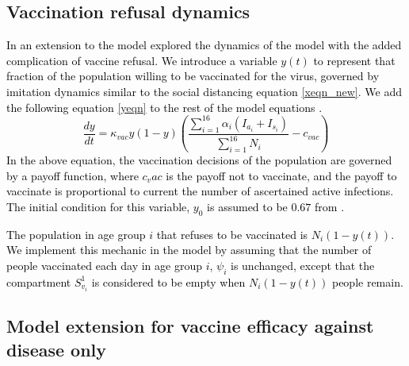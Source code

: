 \subsection{Vaccination refusal dynamics}
\textcolor{black}{In an extension to the model explored the dynamics of the model with the added complication of vaccine refusal. We introduce a variable $y(t)$ to represent that fraction of the population willing to be vaccinated for the virus, governed by imitation dynamics similar to the social distancing equation \ref{xeqn_new}. We add the following equation \ref{yeqn} to the rest of the model equations \cite{bauch2005imitation, bauch2012evolutionary}.
\begin{equation}
    \frac{d y}{dt} = \kappa_{vac} y(1 - y)\left(\frac{\sum_{i=1}^{16}\alpha_i(I_{a_i} + I_{s_i})}{\sum_{i=1}^{16} N_i} - c_{vac}\right)
    \label{yeqn}
\end{equation}
In the above equation, the vaccination decisions of the population are governed by a payoff function, where $c_vac$ is the payoff not to vaccinate, and the payoff to vaccinate is proportional to current the number of ascertained active infections. The initial condition for this variable, $y_0$ is assumed to be $0.67$ from \cite{MALIK2020100495}.}

\textcolor{black}{The population in age group $i$ that refuses to be vaccinated is $N_i (1 - y(t))$. We implement this mechanic in the model by assuming that the number of people vaccinated each day in age group $i$, $\psi_i$ is unchanged, except that the compartment $S_{v_i}^1$ is considered to be empty when $N_i (1 - y(t))$ people remain.}


\subsection{Model extension for vaccine efficacy against disease only}

